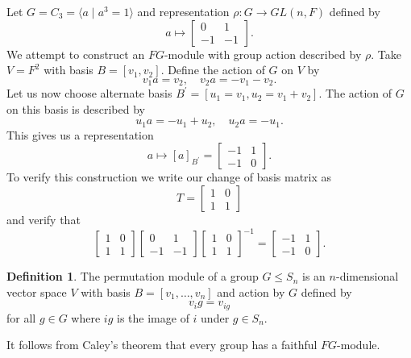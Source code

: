 \documentclass[11pt, notitlepage]{article}
\numberwithin{equation}{section}
\theoremstyle{plain}
\theoremstyle{definition}
\newtheorem{definition}[theorem]{Definition}
\newenvironment{example}
	{\pushQED{\qed}\renewcommand{\qedsymbol}{$\blacktriangleleft$}\examplex}
	{\popQED\endexamplex}
\begin{document}
\begin{example}
	Let $G = C_3 = \langle a \mid a^3 = 1 \rangle$ and representation $\rho: G \to GL(n,F)$ defined by
\[
	a \mapsto \begin{bmatrix} 0 & 1 \\ -1 & -1 \end{bmatrix}.
\]
	We attempt to construct an $FG$-module with group action described by $\rho$. Take $V = F^2$ with basis $B = [v_1, v_2]$. Define the action of $G$ on $V$ by
\[
	v_1 a = v_2, \quad v_2 a = -v_1 - v_2.
\]
	Let us now choose alternate basis $B^\prime = [u_1 = v_1, u_2 = v_1 + v_2]$. The action of $G$ on this basis is described by
\[
	u_1 a = -u_1 + u_2, \quad u_2 a = -u_1.
\]
This gives us a representation
\[
	a \mapsto [a]_{B^\prime} = \begin{bmatrix} -1 & 1\\ -1 & 0 \end{bmatrix}.
\]
To verify this construction we write our change of basis matrix as
\[
	T = \begin{bmatrix} 1 & 0\\ 1 & 1 \end{bmatrix}
\]
and verify that
\[
	\begin{bmatrix} 1 & 0\\ 1 & 1 \end{bmatrix}
	\begin{bmatrix} 0 & 1\\ -1 & -1 \end{bmatrix}
	\begin{bmatrix} 1 & 0\\ 1 & 1 \end{bmatrix}^{-1} = 
	\begin{bmatrix} -1 & 1\\ -1 & 0 \end{bmatrix}.
\]
\end{example}

\begin{definition}
	The permutation module of a group $G \leq S_n$ is an $n$-dimensional vector space $V$ with basis $B = [v_1, \ldots, v_n]$ and action by $G$ defined by
\[
	v_i g = v_{ig}
\]
for all $g \in G$ where $ig$ is the image of $i$ under $g \in S_n$.
\end{definition}


It follows from Caley's theorem that every group has a faithful $FG$-module.
\end{document}
